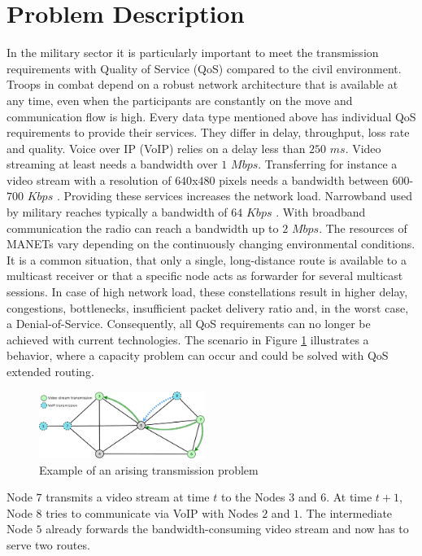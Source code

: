 \documentclass[conference]{IEEEtran}
\newcommand{\MANET}{MANET}
\newcommand{\QOS}{QoS}
\newcommand{\VOIP}{VoIP}
\begin{document}
	\section{Problem Description}
	In the military sector it is particularly important to meet the transmission requirements with Quality of Service (\QOS{}) compared to the civil environment. Troops in combat depend on a robust network architecture that is available at any time, even when the participants are constantly on the move and communication flow is high. Every data type mentioned above has individual \QOS{} requirements to provide their services. They differ in delay, throughput, loss rate and quality. Voice over IP (\VOIP{}) relies on a delay less than $250$ $ms$. Video streaming at least needs a bandwidth over $1$ $Mbps$. Transferring for instance a video stream with a resolution of $640$x$480$ pixels needs a bandwidth between $600$-$700$ $Kbps$ \cite{Video:Bandwidth}. Providing these services increases the network load. Narrowband used by military reaches typically a bandwidth of $64$ $Kbps$ \cite{military:narrowband}. With broadband communication the radio can reach a bandwidth up to $2$ $Mbps$. The resources of \MANET{s} vary depending on the continuously changing environmental conditions. It is a common situation, that only a single, long-distance route is available to a multicast receiver or that a specific node acts as forwarder for several multicast sessions. In case of high network load, these constellations result in higher delay, congestions, bottlenecks, insufficient packet delivery ratio and, in the worst case, a Denial-of-Service. Consequently, all \QOS{} requirements can no longer be achieved with current technologies. The scenario in Figure \ref{fig:multicast} illustrates a behavior, where a capacity problem can occur and could be solved with \QOS{} extended routing.
	\begin{figure}[h]
		\centering
		\includegraphics[width=0.48\textwidth]{figures/MulticastCommunicationOne.pdf}
		\caption{Example of an arising transmission problem}
		\label{fig:multicast}
	\end{figure}
	Node $7$ transmits a video stream at time $t$ to the Nodes $3$ and $6$. At time $t+1$, Node $8$ tries to communicate via \VOIP{} with Nodes $2$ and $1$. The intermediate Node $5$ already forwards the bandwidth-consuming video stream and now has to serve two routes. 
	
\end{document}
